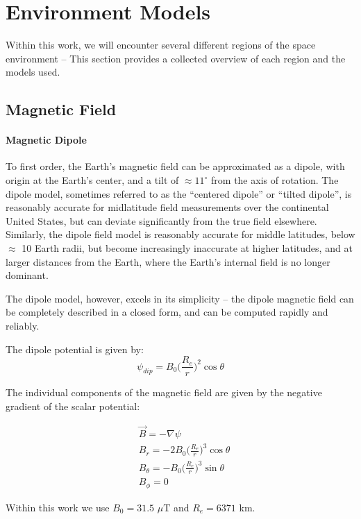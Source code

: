 \section{Environment Models}
Within this work, we will encounter several different regions of the space environment -- This section provides a collected overview of each region and the models used.
\subsection{Magnetic Field}
\paragraph{Magnetic Dipole}
\label{section:dipole_model}
To first order, the Earth's magnetic field can be approximated as a dipole, with origin at the Earth's center, and a tilt of $\approx 11^\circ$ from the axis of rotation. The dipole model, sometimes referred to as the ``centered dipole'' or ``tilted dipole'', is reasonably accurate for midlatitude field measurements over the continental United States, but can deviate significantly from the true field elsewhere. Similarly, the dipole field model is reasonably accurate for middle latitudes, below $\approx$ 10 Earth radii, but become increasingly inaccurate at higher latitudes, and at larger distances from the Earth, where the Earth's internal field is no longer dominant.

The dipole model, however, excels in its simplicity -- the dipole magnetic field can be completely described in a closed form, and can be computed rapidly and reliably.

The dipole potential is given by:
\begin{equation}
\psi_{dip} = B_0\big(\frac{R_e}{r}\big)^2\cos\theta
\end{equation}

The individual components of the magnetic field are given by the negative gradient of the scalar potential:

\begin{eqnarray}
& \vec{B} = -\nabla \psi \\
& B_r = -2 B_0\big(\frac{R_e}{r}\big)^3\cos\theta \\
& B_{\theta} = -B_0\big(\frac{R_e}{r}\big)^3 \sin\theta \\ 
& B_\phi = 0
\end{eqnarray}

Within this work we use $B_0 = 31.5$ $\mu$T and $R_e=6371$ km.

